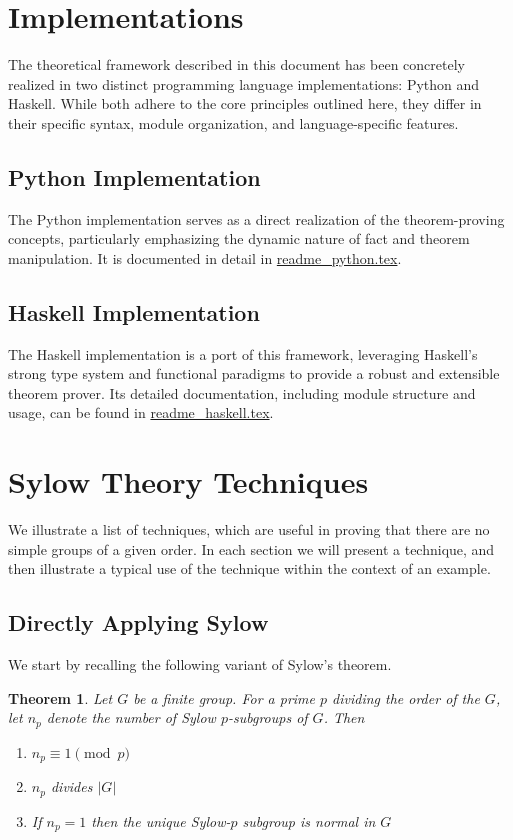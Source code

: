 \documentclass[11pt,
oneside]{article} %
\newtheorem{theorem}{Theorem}
\begin{document}
\section{Implementations}

The theoretical framework described in this document has been concretely realized in two distinct programming language implementations: Python and Haskell. While both adhere to the core principles outlined here, they differ in their specific syntax, module organization, and language-specific features.

\subsection{Python Implementation}
The Python implementation serves as a direct realization of the theorem-proving concepts, particularly emphasizing the dynamic nature of fact and theorem manipulation. It is documented in detail in \href{readme_python.tex}{readme\_python.tex}.

\subsection{Haskell Implementation}
The Haskell implementation is a port of this framework, leveraging Haskell's strong type system and functional paradigms to provide a robust and extensible theorem prover. Its detailed documentation, including module structure and usage, can be found in \href{readme_haskell.tex}{readme\_haskell.tex}.

\section{Sylow Theory Techniques}

We illustrate a list of techniques, which are useful in proving that
there are no simple groups of a given order.  In each section we will
present a technique, and then illustrate a typical use of the
technique within the context of an example.

\subsection{Directly Applying Sylow}

We start by recalling the following variant of Sylow's theorem.

\begin{theorem}
Let $G$ be a finite group.  For a prime $p$ dividing the order of the $G$, let $n_p$ denote the number of Sylow $p$-subgroups of $G$. Then
\begin{enumerate}
\item $n_p \equiv 1 \pmod p$
\item $n_p$ divides $|G|$
\item If $n_p = 1$ then the unique Sylow-$p$ subgroup is normal in $G$ 
\end{enumerate}
\end{theorem}
\end{document}
